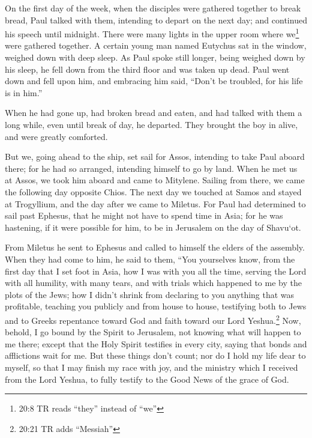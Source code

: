 \myverse{}On the first day of the week, when the disciples were gathered
together to break bread, Paul talked with them, intending to depart on the next day; and continued his
speech until midnight.
\myverse{}There were many lights in the upper room where we\footnote{20:8 TR reads “they” instead of “we”} were gathered together.
\myverse{}A certain young man named Eutychus sat in the window, weighed down with deep
sleep. As Paul spoke still longer, being weighed down by his sleep, he fell down from the third floor
and was taken up dead.
\myverse{}Paul went down and fell upon him, and embracing him said, “Don’t be troubled,
for his life is in him.”

\myverse{}When he had gone up, had broken bread and eaten, and had talked
with them a long while, even until break of day, he departed.
\myverse{}They brought the boy in alive, and were greatly comforted.

\myverse{}But we, going ahead to the ship, set sail for Assos, intending
to take Paul aboard there; for he had so arranged, intending himself to go by land.
\myverse{}When he met us at Assos, we took him aboard and came to Mitylene.
\myverse{}Sailing from there, we came the following day opposite Chios. The next day
we touched at Samos and stayed at Trogyllium, and the day after we came to Miletus.
\myverse{}For Paul had determined to sail past Ephesus, that he might not have to spend
time in Asia; for he was hastening, if it were possible for him, to be in Jerusalem on the day of Shavu`ot.

\myverse{}From Miletus he sent to Ephesus and called to himself the elders
of the assembly.
\myverse{}When they had come to him, he said to them, “You yourselves know, from the
first day that I set foot in Asia, how I was with you all the time,
\myverse{}serving the Lord with all humility, with many tears, and with trials which
happened to me by the plots of the Jews;
\myverse{}how I didn’t shrink from declaring to you anything that was profitable, teaching
you publicly and from house to house,
\myverse{}testifying both to Jews and to Greeks repentance toward God and faith toward
our Lord Yeshua.\footnote{20:21 TR adds “Messiah”}
\myverse{}Now, behold, I go bound by the Spirit to Jerusalem, not knowing what will
happen to me there;
\myverse{}except that the Holy Spirit testifies in every city, saying that bonds and
afflictions wait for me.
\myverse{}But these things don’t count; nor do I hold my life dear to myself, so that
I may finish my race with joy, and the ministry which I received from the Lord Yeshua, to fully testify
to the Good News of the grace of God.

